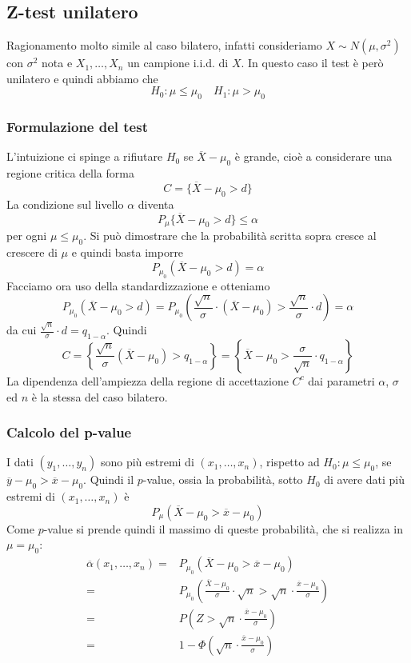 \subsection{Z-test unilatero}
Ragionamento molto simile al caso bilatero, infatti consideriamo $X \sim N(\mu, \sigma^2)$ con
$\sigma^2$ nota e $X_1, \dots, X_n$ un campione i.i.d. di $X$. In questo caso il test è però
unilatero e quindi abbiamo che
\[ H_0: \mu \leq \mu_0 \quad H_1: \mu > \mu_0 \]

\subsubsection{Formulazione del test}
L'intuizione ci spinge a rifiutare $H_0$ se $\overline{X} - \mu_0$ è grande, cioè a considerare
una regione critica della forma
\[ C = \{ \overline{X} - \mu_0 > d \} \]
La condizione sul livello $\alpha$ diventa
\[ P_\mu \{ \overline{X} - \mu_0 > d \} \leq \alpha \]
per ogni $\mu \leq \mu_0$. Si può dimostrare che la probabilità scritta sopra cresce al crescere
di $\mu$ e quindi basta imporre
\[ P_{\mu_0} (\overline{X} - \mu_0 > d) = \alpha \]
Facciamo ora uso della standardizzazione e otteniamo
\[
	P_{\mu_0} (\overline{X} - \mu_0 > d) =
	P_{\mu_0} \left( \frac{\sqrt{n}}{\sigma} \cdot (\overline{X} - \mu_0) >
	\frac{\sqrt{n}}{\sigma} \cdot d \right) = \alpha
\]
da cui $\frac{\sqrt{n}}{\sigma} \cdot d = q_{1-\alpha}$. Quindi
\[
	C = \left\{ \frac{\sqrt{n}}{\sigma} (\overline{X} - \mu_0) > q_{1-\alpha} \right\}
	= \left\{ \overline{X} - \mu_0 > \frac{\sigma}{\sqrt{n}} \cdot q_{1-\alpha} \right\}
\]
La dipendenza dell'ampiezza della regione di accettazione $C^c$ dai parametri $\alpha$, $\sigma$
ed $n$ è la stessa del caso bilatero.

\subsubsection{Calcolo del p-value}
I dati $(y_1, \dots, y_n)$ sono più estremi di $(x_1, \dots, x_n)$, rispetto ad
$H_0: \mu \leq \mu_0$, se $\overline{y} - \mu_0 > \overline{x} - \mu_0$. Quindi il $p$-value,
ossia la probabilità, sotto $H_0$ di avere dati più estremi di $(x_1, \dots, x_n)$ è
\[ P_\mu \left( \overline{X} - \mu_0 > \overline{x} - \mu_0 \right) \]
Come $p$-value si prende quindi il massimo di queste probabilità, che si realizza in $\mu = \mu_0$:
\begin{align*}
	\overline{\alpha} (x_1, \dots, x_n)
	= & P_{\mu_0} \left( \overline{X} - \mu_0 > \overline{x} - \mu_0 \right)       \\
	= & P_{\mu_0} \left( \frac{\overline{X} - \mu_0}{\sigma} \cdot \sqrt{n} >
	\sqrt{n} \cdot \frac{\overline{x} - \mu_0}{\sigma} \right)                     \\
	= & P \left( Z > \sqrt{n} \cdot \frac{\overline{x} - \mu_0}{\sigma} \right)    \\
	= & 1 - \Phi \left( \sqrt{n} \cdot \frac{\overline{x} - \mu_0}{\sigma} \right)
\end{align*}

